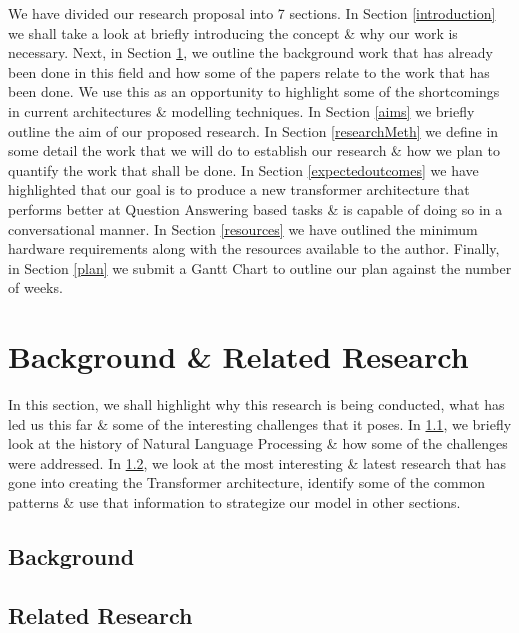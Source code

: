 \documentclass[11pt]{article}
\begin{document}
We have divided our research proposal into 7 sections.
In Section \ref{introduction} we shall take a look at briefly introducing the concept \& why our work is necessary. Next, in Section \ref{backRR}, we outline the background work that has already been done in this field and how some of the papers relate to the work that has been done. We use this as an opportunity to highlight some of the shortcomings in current architectures \& modelling techniques. In Section \ref{aims} we briefly outline the aim of our proposed research. In Section \ref{researchMeth} we define in some detail the work that we will do to establish our research \& how we plan to quantify the work that shall be done. In Section \ref{expectedoutcomes} we have highlighted that our goal is to produce a new transformer architecture that performs better at Question Answering based tasks \& is capable of doing so in a conversational manner.
In Section \ref{resources} we have outlined the minimum hardware requirements along with the resources available to the author. Finally, in Section \ref{plan} we submit a Gantt Chart to outline our plan against the number of weeks.

\section{Background \& Related Research}\label{backRR}
In this section, we shall highlight why this research is being conducted, what has led us this far \& some of the interesting challenges that it poses. In \ref{back}, we briefly look at the history of Natural Language Processing \& how some of the challenges were addressed. In \ref{rr}, we look at the most interesting \& latest research that has gone into creating the Transformer architecture, identify some of the common patterns \& use that information to strategize our model in other sections.
\subsection{Background}\label{back}

\subsection{Related Research}\label{rr}
\end{document}
